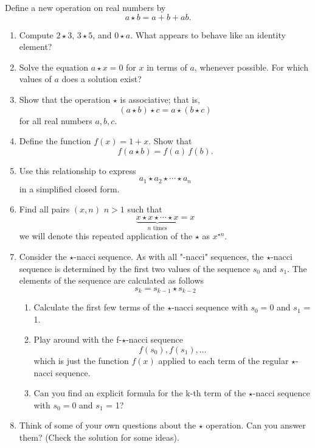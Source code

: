 \begin{problem}
Define a new operation on real numbers by
\[
a \star b = a + b + ab.
\]
\begin{enumerate}[label=(\alph*)]
    \item Compute $2 \star 3$, $3 \star 5$, and $0 \star a$. What appears to behave like an identity element?
    
    \item Solve the equation $a \star x = 0$ for $x$ in terms of $a$, whenever possible. For which values of $a$ does a solution exist?
    
    \item Show that the operation $\star$ is associative; that is,
    \[
    (a \star b) \star c = a \star (b \star c)
    \]
    for all real numbers $a,b,c$.
    
    \item Define the function $f(x) = 1 + x$. Show that
    \[
    f(a \star b) = f(a)\,f(b).
    \]
    
    \item Use this relationship to express
    \[
    a_1 \star a_2 \star \cdots \star a_n
    \]
    in a simplified closed form.
    
    \item Find all pairs $(x, n)$ $n >1$ such that 
    \[
    \underbrace{x \star x \star \cdots \star x}_{n \text{ times}} = x
    \]
    we will denote this repeated application of the $\star$ as $x^{\star n}$.
    \item Consider the $\star$-nacci sequence. As with all "-nacci" sequences, the $\star$-nacci sequence is determined by the first two values of the sequence $s_0$ and $s_1$. The elements of the sequence are calculated as follows
    \[
    s_k = s_{k-1}\star s_{k-2}
    \]
    \begin{enumerate}
        \item Calculate the first few terms of the $\star$-nacci sequence with $s_0 = 0$ and $s_1$ = 1.
        \item Play around with the f-$\star$-nacci sequence 
        \[f(s_0), f(s_1), \ldots\]
        which is just the function $f(x)$ applied to each term of the regular $\star$-nacci sequence.
        \item Can you find an explicit formula for the k-th term of the $\star$-nacci sequence with $s_0 = 0$ and $s_1$ = 1?
    \end{enumerate}
    \item Think of some of your own questions about the $\star$ operation. Can you answer them? (Check the solution for some ideas). 
\end{enumerate}
\end{problem}



